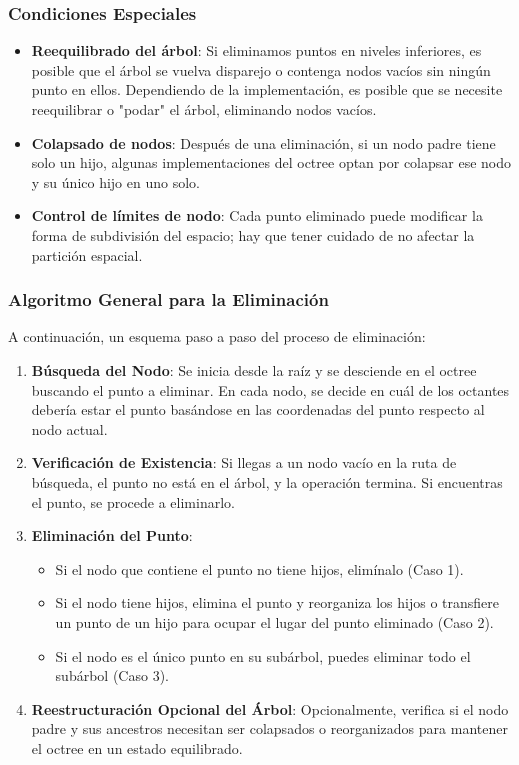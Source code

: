 \documentclass{article}
\begin{document}
\subsubsection{Condiciones Especiales}
\begin{itemize}
    \item \textbf{Reequilibrado del árbol}: Si eliminamos puntos en niveles inferiores, es posible que el árbol se vuelva disparejo o contenga nodos vacíos sin ningún punto en ellos. Dependiendo de la implementación, es posible que se necesite reequilibrar o "podar" el árbol, eliminando nodos vacíos.
    \item \textbf{Colapsado de nodos}: Después de una eliminación, si un nodo padre tiene solo un hijo, algunas implementaciones del octree optan por colapsar ese nodo y su único hijo en uno solo.
    \item \textbf{Control de límites de nodo}: Cada punto eliminado puede modificar la forma de subdivisión del espacio; hay que tener cuidado de no afectar la partición espacial.
\end{itemize}

\subsubsection{Algoritmo General para la Eliminación}
A continuación, un esquema paso a paso del proceso de eliminación:

\begin{enumerate}
    \item \textbf{Búsqueda del Nodo}: Se inicia desde la raíz y se desciende en el octree buscando el punto a eliminar. En cada nodo, se decide en cuál de los octantes debería estar el punto basándose en las coordenadas del punto respecto al nodo actual.
    \item \textbf{Verificación de Existencia}: Si llegas a un nodo vacío en la ruta de búsqueda, el punto no está en el árbol, y la operación termina. Si encuentras el punto, se procede a eliminarlo.
    \item \textbf{Eliminación del Punto}: 
    \begin{itemize}
        \item Si el nodo que contiene el punto no tiene hijos, elimínalo (Caso 1).
        \item Si el nodo tiene hijos, elimina el punto y reorganiza los hijos o transfiere un punto de un hijo para ocupar el lugar del punto eliminado (Caso 2).
        \item Si el nodo es el único punto en su subárbol, puedes eliminar todo el subárbol (Caso 3).
    \end{itemize}
    \item \textbf{Reestructuración Opcional del Árbol}: Opcionalmente, verifica si el nodo padre y sus ancestros necesitan ser colapsados o reorganizados para mantener el octree en un estado equilibrado.
\end{enumerate}
\end{document}
